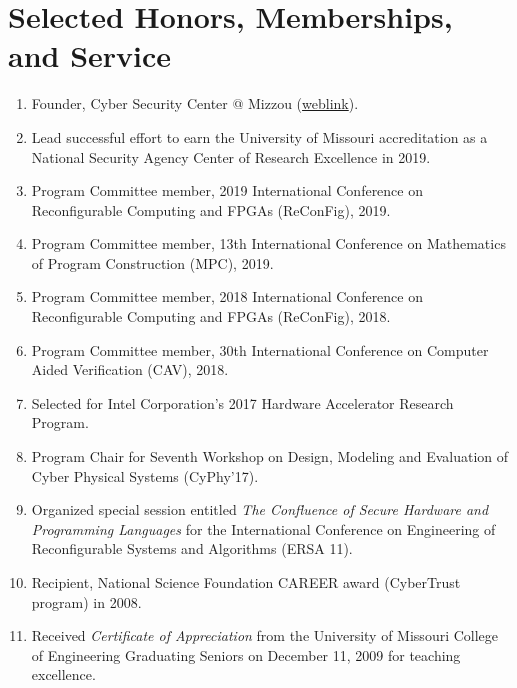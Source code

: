\documentclass[12pt]{article} %
\begin{document}
\section*{Selected Honors, Memberships, and Service}

\begin{enumerate}[leftmargin=0mm]

\item Founder, Cyber Security Center @ Mizzou (\href{https://engineering.missouri.edu/cybersecurity/}{weblink}).

\item Lead successful effort to earn the University of Missouri accreditation as a National Security Agency Center of Research Excellence in 2019. 

\item Program Committee member, 2019 International Conference on Reconfigurable Computing and FPGAs (ReConFig), 2019.

\item Program Committee member, 13th International Conference on
Mathematics of Program Construction (MPC), 2019.

\item Program Committee member, 2018 International Conference on Reconfigurable Computing and FPGAs (ReConFig), 2018.

\item Program Committee member, 30th International Conference on Computer Aided Verification (CAV), 2018.

\item Selected for Intel Corporation's 2017 Hardware Accelerator Research Program.

\item Program Chair for 
Seventh Workshop on Design, Modeling and Evaluation of Cyber Physical Systems (CyPhy'17).

\item Organized special session entitled \emph{The Confluence of Secure Hardware and Programming Languages} for the International Conference on 
Engineering of Reconfigurable Systems and Algorithms (ERSA 11).

\item  Recipient, National Science Foundation CAREER award (CyberTrust program) in 2008.

\item Received \emph{Certificate of Appreciation} from the University of Missouri College of Engineering Graduating Seniors on December 11, 2009 for teaching excellence.


\end{enumerate}
\end{document}
